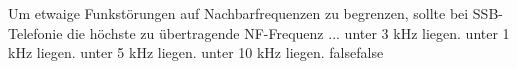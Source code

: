     {Um etwaige Funkstörungen auf Nachbarfrequenzen zu begrenzen, sollte bei SSB-Telefonie die höchste zu übertragende NF-Frequenz ...}
    {unter 3 kHz liegen.}
    {unter 1 kHz liegen.}
    {unter 5 kHz liegen.}
    {unter 10 kHz liegen.}
    {false}{false}
